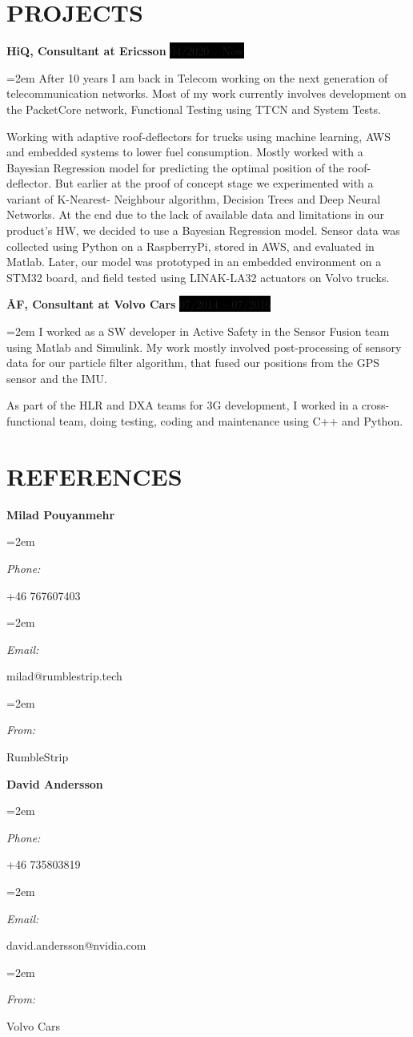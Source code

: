 \documentclass[paper=a4,fontsize=11pt]{scrartcl}	 			%
\newlength{\spacebox}
\newcommand{\sepspace}{\vspace*{1em}}			%
\newcommand{\NewPart}[1]{\section*{\uppercase{#1}}}
\newcommand{\PersonalEntry}[2]{
		\noindent\hangindent=2em\hangafter=0 		%
		\parbox{\spacebox}{						%
		\textit{#1}}								%
		\hspace{1.5em} #2 \par}					%
\newcommand{\SkillsEntry}[2]{						%
		\noindent\hangindent=2em\hangafter=0 		%
		\parbox{\spacebox}{						%
		\textit{#1}}								%
		\hspace{1.5em} #2 \par}					%
\newcommand{\ReferenceEntry}[1]{
        \large
		\noindent \textbf{#1} \par
		\normalsize \par
    }
\newcommand{\ProjectEntry}[4]{
		\noindent \textbf{#1} \hfill 	        	%
		\colorbox{Black}{\color{White}#2} \par		%
		\noindent\hangindent=2em\hangafter=0 \small #3 	%
		\normalsize \par \sepspace}
\begin{document}

\clearpage

\NewPart{Projects}{}

\ProjectEntry{HiQ, Consultant at Ericsson}{04/2020 -- Now}
{
    After 10 years I am back in Telecom working on the next generation of telecommunication networks. Most of my work
    currently involves development on the PacketCore network, Functional Testing using TTCN and System Tests.
}

\ProjectEntry{RumbleStrip}{09/2017 -- 10/2019}
{
    Working with adaptive roof-deflectors for trucks using machine learning, AWS and embedded systems to lower fuel
    consumption.  Mostly worked with a Bayesian Regression model for predicting the optimal position of the roof-
    deflector.  But earlier at the proof of concept stage we experimented with a variant of K-Nearest- Neighbour
    algorithm, Decision Trees and Deep Neural Networks.  At the end due to the lack of available data and limitations in
    our product's HW, we decided to use a Bayesian Regression model.  Sensor data was collected using Python on a
    RaspberryPi, stored in AWS, and evaluated in Matlab.  Later, our model was prototyped in an embedded environment on
    a STM32 board, and field tested using LINAK-LA32 actuators on Volvo trucks.
}

\ProjectEntry{ÅF, Consultant at Volvo Cars}{07/2014 -- 07/2016}
{
    I worked as a SW developer in Active Safety in the Sensor Fusion team using Matlab and Simulink.  My work mostly
    involved post-processing of sensory data for our particle filter algorithm, that fused our positions from the GPS
    sensor and the IMU.
}

\ProjectEntry{Nokia Siemens Networks}{08/2009 -- 08/2012}
{
    As part of the HLR and DXA teams for 3G development, I worked in a cross-functional team, doing testing, coding and
    maintenance using C++ and Python.
}

\NewPart{References}{}
\ReferenceEntry{Milad Pouyanmehr}{}{}
\SkillsEntry{Phone:}{+46 767607403}
\SkillsEntry{Email:}{milad@rumblestrip.tech}
\SkillsEntry{From:}{RumbleStrip}
\sepspace

\ReferenceEntry{David Andersson}{}{}
\SkillsEntry{Phone:}{+46 735803819}
\SkillsEntry{Email:}{david.andersson@nvidia.com}
\SkillsEntry{From:}{Volvo Cars}

\end{document}

